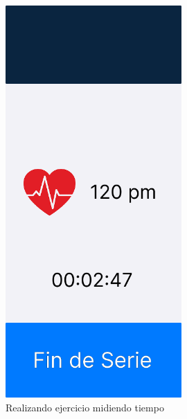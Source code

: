 \begin{figure}[H]
   \centering
    \includegraphics[width=0.6\textwidth]{fotos/Frame 60.png}
    \caption{Realizando ejercicio midiendo tiempo}
    \label{fig:Realizando ejercicio midiendo tiempo}
\end{figure}
